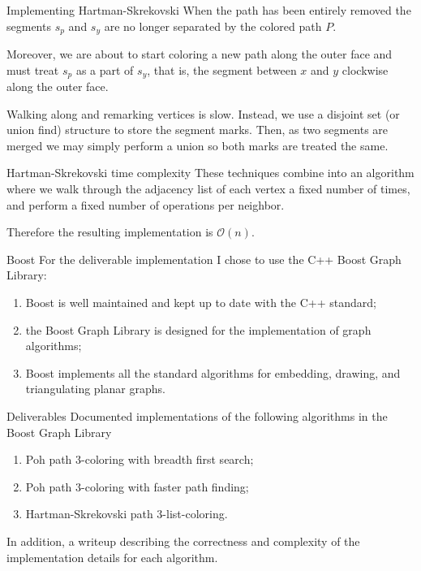 \documentclass[pdf]{beamer}
\theoremstyle{definition}
\theoremstyle{definition}
\theoremstyle{definition}
\theoremstyle{definition}
\theoremstyle{definition}
\theoremstyle{definition}
\theoremstyle{definition}
\theoremstyle{definition}
\theoremstyle{definition}
\theoremstyle{definition}
\theoremstyle{definition}
\theoremstyle{definition}
\begin{document}
\begin{frame}{Implementing Hartman-Skrekovski}
When the path has been entirely removed the segments
$s_p$ and $s_y$ are no longer separated by the colored path $P$.

Moreover, we are about to start coloring a new path along the outer face and
must treat $s_p$ as a part of $s_y$, that is, the segment between $x$ and $y$
clockwise along the outer face.

Walking along and remarking vertices is slow. Instead, we use a disjoint set
(or union find) structure to store the segment marks. Then, as two segments
are merged we may simply perform a union so both marks are treated the same.
\end{frame}

\begin{frame}{Hartman-Skrekovski time complexity}
These techniques combine into an algorithm where we walk through the adjacency list of
each vertex a fixed number of times, and perform a fixed number of
operations per neighbor.

Therefore the resulting implementation is $\mathcal{O}(n)$.
\end{frame}

\begin{frame}{Boost}
For the deliverable implementation I chose to use the C++ Boost Graph Library:

\begin{enumerate}
\item Boost is well maintained and kept up to date with the C++ standard;
\item the Boost Graph Library is designed for the implementation of graph algorithms;
\item Boost implements all the standard algorithms for embedding,
	drawing, and triangulating planar graphs.
\end{enumerate}
\end{frame}

\begin{frame}{Deliverables}
Documented implementations of the following algorithms in the Boost Graph Library
\begin{enumerate}
\item Poh path $3$-coloring with breadth first search;
\item Poh path $3$-coloring with faster path finding;
\item Hartman-Skrekovski path $3$-list-coloring.
\end{enumerate}

In addition, a writeup describing the correctness and complexity of the
implementation details for each algorithm.
\end{frame}
\end{document}
